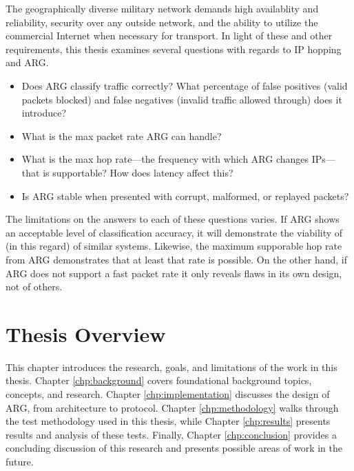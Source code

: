\par The geographically diverse military network demands high availablity and reliability, security over any outside network, and the ability to utilize the commercial Internet when necessary for transport. In light of these and other requirements, this thesis examines several questions with regards to \ac{IP} hopping and \ac{ARG}.
\begin{itemize}
	\item Does \ac{ARG} classify traffic correctly? What percentage of false positives (valid packets blocked) and false negatives (invalid traffic allowed through) does it introduce?
	\item What is the max packet rate \ac{ARG} can handle?
	\item What is the max hop rate---the frequency with which \ac{ARG} changes \acp{IP}---that is supportable? How does latency affect this?
	\item Is \ac{ARG} stable when presented with corrupt, malformed, or replayed packets?
\end{itemize}

\par The limitations on the answers to each of these questions varies. If \ac{ARG} shows an acceptable level of classification accuracy, it will demonstrate the viability of (in this regard) of similar systems. Likewise, the maximum supporable hop rate from \ac{ARG} demonstrates that at least that rate is possible. On the other hand, if \ac{ARG} does not support a fast packet rate it only reveals flaws in its own design, not of others.


\section{Thesis Overview}
\par This chapter introduces the research, goals, and limitations of the work in this thesis. Chapter \ref{chp:background} covers foundational background topics, concepts, and research. Chapter \ref{chp:implementation} discusses the design of \ac{ARG}, from architecture to protocol. Chapter \ref{chp:methodology} walks through the test methodology used in this thesis, while Chapter \ref{chp:results} presents results and analysis of these tests. Finally, Chapter \ref{chp:conclusion} provides a concluding discussion of this research and presents possible areas of work in the future.

